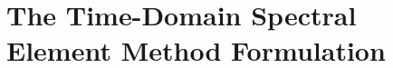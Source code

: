 
\chapter[The Time-Domain Spectral Element Method Formulation]{The Time-Domain Spectral Element Method Formulation}
\label{ch:sem}













